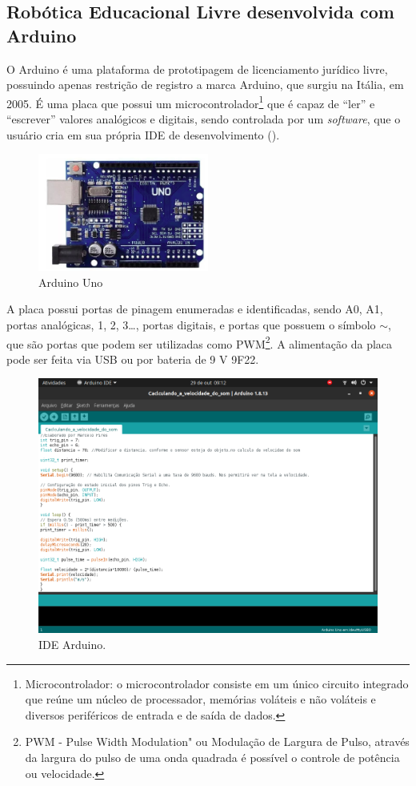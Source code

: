 \documentclass{textolivre}
\begin{document}
\subsection{Robótica Educacional Livre desenvolvida com Arduino}
O Arduino é uma plataforma de prototipagem de licenciamento jurídico livre, possuindo apenas restrição de registro a marca Arduino, que surgiu na Itália, em 2005. É uma placa que possui um microcontrolador\footnote{Microcontrolador: o microcontrolador consiste em um único circuito integrado que reúne um núcleo de processador, memórias voláteis e não voláteis e diversos periféricos de entrada e de saída de dados.} que é capaz de “ler” e “escrever” valores analógicos e digitais, sendo controlada por um \textit{software}, que o usuário cria em sua própria IDE de desenvolvimento ().

\begin{figure}[htbp]
 \centering
 \includegraphics[width=0.5\textwidth]{fig-002.png}
 \caption{Arduino Uno}
 \label{fig2}
\end{figure}

A placa possui portas de pinagem enumeradas e identificadas, sendo A0, A1, portas analógicas, 1, 2, 3…, portas digitais, e portas que possuem o símbolo $\sim$, que são portas que podem ser utilizadas como PWM\footnote{PWM - Pulse Width Modulation" ou Modulação de Largura de Pulso, através da largura do pulso de uma onda quadrada é possível o controle de potência ou velocidade.}. A alimentação da placa pode ser feita via USB ou por bateria de 9 V 9F22.

\begin{figure}[htbp]
 \centering
 \includegraphics[width=\textwidth]{fig-003.png}
 \caption{IDE Arduino.}
 \label{fig3}
\end{figure}
\end{document}
